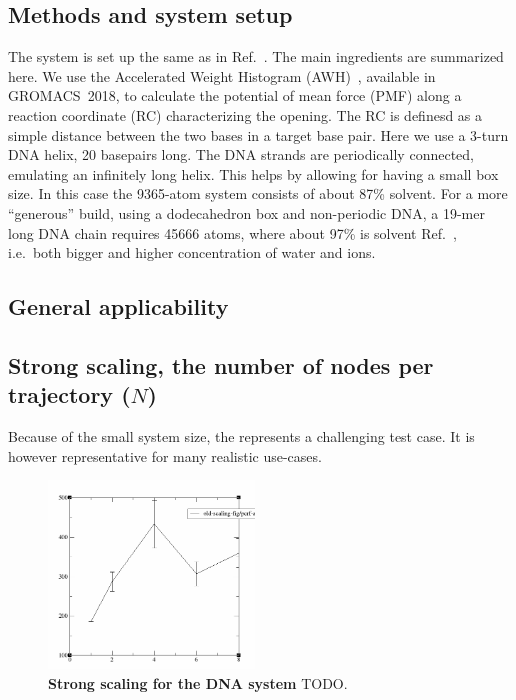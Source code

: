 \documentclass[11pt,a4paper]{article}
\begin{document}
\subsection{Methods and system setup}
The system is set up the same as in Ref.~\cite{lindahl2017sequence}. The main ingredients are summarized here.
We use the Accelerated Weight Histogram (AWH)~\cite{lindahl2014accelerated}, available in GROMACS~2018, to calculate the potential of mean force (PMF) along a reaction coordinate (RC) characterizing the opening. The RC is definesd as a simple distance between the two bases in a target base pair. %
Here we use a  3-turn DNA helix, 20 basepairs long. The DNA strands are periodically connected, emulating an infinitely long helix. This helps by allowing for having a small box size. In this case the 9365-atom system consists of about 87\% solvent. For a more ``generous'' build, using a dodecahedron box and non-periodic DNA, a 19-mer long DNA chain requires 45666 atoms, where about 97\% is solvent Ref.~\cite{lindahl2017sequence}, i.e.\ both bigger and higher concentration of water and ions.

\subsection{General applicability}
\cite{zhang2018accurate}

\subsection{Strong scaling, the number of nodes per trajectory ($N$)}
Because of the small system size, the represents a challenging test case. It is however representative for many realistic use-cases. %
\begin{figure}[thbp!]
\includegraphics[height=5cm]{figs/dna-strong-scaling-screenshot.png}
\caption{\label{fig:dnastrongscaling}
\textbf{Strong scaling for the DNA system} TODO. 
}
\end{figure}
\end{document}
